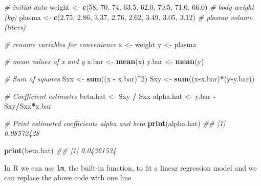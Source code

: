 \documentclass[
]{book}
\newenvironment{Shaded}{\begin{snugshade}}{\end{snugshade}}
\newcommand{\CommentTok}[1]{\textcolor[rgb]{0.56,0.35,0.01}{\textit{#1}}}
\newcommand{\DecValTok}[1]{\textcolor[rgb]{0.00,0.00,0.81}{#1}}
\newcommand{\FloatTok}[1]{\textcolor[rgb]{0.00,0.00,0.81}{#1}}
\newcommand{\KeywordTok}[1]{\textcolor[rgb]{0.13,0.29,0.53}{\textbf{#1}}}
\newcommand{\NormalTok}[1]{#1}
\newcommand{\OperatorTok}[1]{\textcolor[rgb]{0.81,0.36,0.00}{\textbf{#1}}}
\newcommand{\StringTok}[1]{\textcolor[rgb]{0.31,0.60,0.02}{#1}}
\theoremstyle{definition}
\theoremstyle{definition}
\theoremstyle{definition}
\theoremstyle{remark}
\begin{document}
\begin{Shaded}
\begin{Highlighting}[]
\CommentTok{\# initial data}
\NormalTok{weight \textless{}{-}}\StringTok{ }\KeywordTok{c}\NormalTok{(}\DecValTok{58}\NormalTok{, }\DecValTok{70}\NormalTok{, }\DecValTok{74}\NormalTok{, }\FloatTok{63.5}\NormalTok{, }\FloatTok{62.0}\NormalTok{, }\FloatTok{70.5}\NormalTok{, }\FloatTok{71.0}\NormalTok{, }\FloatTok{66.0}\NormalTok{) }\CommentTok{\# body weight (kg)}
\NormalTok{plasma \textless{}{-}}\StringTok{ }\KeywordTok{c}\NormalTok{(}\FloatTok{2.75}\NormalTok{, }\FloatTok{2.86}\NormalTok{, }\FloatTok{3.37}\NormalTok{, }\FloatTok{2.76}\NormalTok{, }\FloatTok{2.62}\NormalTok{, }\FloatTok{3.49}\NormalTok{, }\FloatTok{3.05}\NormalTok{, }\FloatTok{3.12}\NormalTok{) }\CommentTok{\# plasma volume (liters)}

\CommentTok{\# rename variables for convenience}
\NormalTok{x \textless{}{-}}\StringTok{ }\NormalTok{weight}
\NormalTok{y \textless{}{-}}\StringTok{ }\NormalTok{plasma}

\CommentTok{\# mean values of x and y}
\NormalTok{x.bar \textless{}{-}}\StringTok{ }\KeywordTok{mean}\NormalTok{(x)}
\NormalTok{y.bar \textless{}{-}}\StringTok{ }\KeywordTok{mean}\NormalTok{(y)}

\CommentTok{\# Sum of squares}
\NormalTok{Sxx \textless{}{-}}\StringTok{  }\KeywordTok{sum}\NormalTok{((x }\OperatorTok{{-}}\StringTok{ }\NormalTok{x.bar)}\OperatorTok{\^{}}\DecValTok{2}\NormalTok{)}
\NormalTok{Sxy \textless{}{-}}\StringTok{ }\KeywordTok{sum}\NormalTok{((x}\OperatorTok{{-}}\NormalTok{x.bar)}\OperatorTok{*}\NormalTok{(y}\OperatorTok{{-}}\NormalTok{y.bar))}

\CommentTok{\# Coefficient estimates}
\NormalTok{beta.hat \textless{}{-}}\StringTok{ }\NormalTok{Sxy }\OperatorTok{/}\StringTok{ }\NormalTok{Sxx}
\NormalTok{alpha.hat \textless{}{-}}\StringTok{ }\NormalTok{y.bar }\OperatorTok{{-}}\StringTok{ }\NormalTok{Sxy}\OperatorTok{/}\NormalTok{Sxx}\OperatorTok{*}\NormalTok{x.bar}

\CommentTok{\# Print estimated coefficients alpha and beta}
\KeywordTok{print}\NormalTok{(alpha.hat)}
\CommentTok{\#\# [1] 0.08572428}

\KeywordTok{print}\NormalTok{(beta.hat)}
\CommentTok{\#\# [1] 0.04361534}
\end{Highlighting}
\end{Shaded}

In R we can use \texttt{lm}, the built-in function, to fit a linear regression model and we can replace the above code with one line
\end{document}
